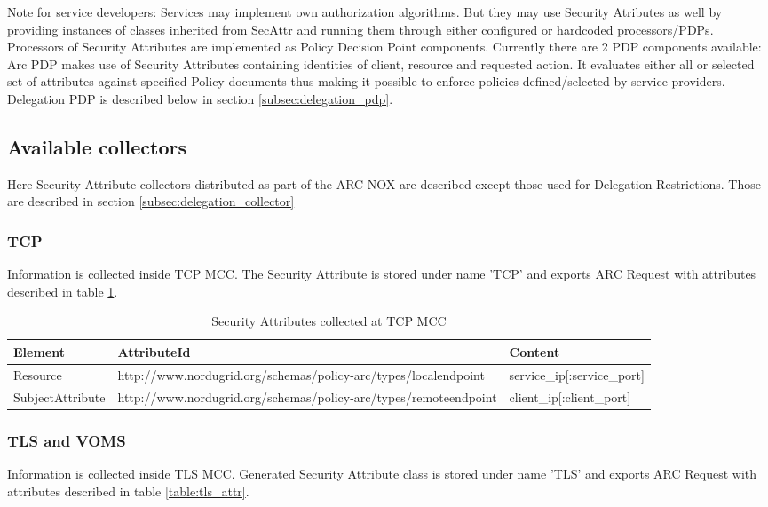 \documentclass{article}                            %
\begin{document}
Note for service developers: Services may implement own authorization algorithms. But they may use Security Atributes as well by providing instances of classes inherited from SecAttr and running them through either configured or hardcoded processors/PDPs.
Processors of Security Attributes are implemented as Policy Decision Point components. Currently there are 2 PDP components available:
Arc PDP makes use of Security Attributes containing identities of client, resource and requested action. It evaluates either all or selected set of attributes against specified Policy documents thus making it possible to enforce policies defined/selected by service providers.
Delegation PDP is described below in section \ref{subsec:delegation_pdp}.


\subsection{Available collectors} %
\label{subsec:sec_attr_avail_collectors}

Here Security Attribute collectors distributed as part of the ARC NOX are described except those used for Delegation Restrictions. Those are described in section \ref{subsec:delegation_collector}

\subsubsection{TCP} %
\label{subsubsec:sec_attr_TCP}
Information is collected inside TCP MCC. The Security Attribute is stored under name 'TCP' and exports ARC Request with attributes described in table \ref{table:tcp_attr}.

\begin{table}[h]
\caption{Security Attributes collected at TCP MCC}
\centering
\begin{tabular}{| l | p{7cm} | p{5cm} |}
\hline
\textbf{Element} & \textbf{AttributeId} & \textbf{Content} \\ \hline
Resource & http://www.nordugrid.org/schemas/policy-arc/types/localendpoint & service\_ip[:service\_port] \\ \hline
SubjectAttribute & http://www.nordugrid.org/schemas/policy-arc/types/remoteendpoint & client\_ip[:client\_port] \\ \hline
\end{tabular}
\label{table:tcp_attr}
\end{table}


\subsubsection{TLS and VOMS} %
\label{subsubsec:sec_attr_TLS_VOMS}
Information is collected inside TLS MCC. Generated Security Attribute class is stored under name 'TLS' and exports ARC Request with attributes described in table \ref{table:tls_attr}.
\end{document}

